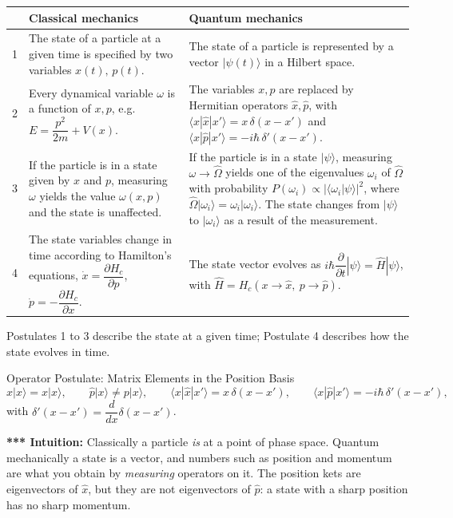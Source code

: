 \documentclass[11pt,a4paper]{article}
\begin{document}
\begin{center}
\renewcommand{\arraystretch}{1.25}
\begin{tabular}{@{}p{0.6cm}p{6.9cm}p{8.2cm}@{}}
\toprule
 & \textbf{Classical mechanics} & \textbf{Quantum mechanics}\\
\midrule
1 & The state of a particle at a given time is specified by two variables $x(t),\,p(t)$. & The state of a particle is represented by a vector $|\psi(t)\rangle$ in a Hilbert space.\\[3pt]
2 & Every dynamical variable $\omega$ is a function of $x,p$, e.g.\ $E=\dfrac{p^2}{2m}+V(x)$. & The variables $x,p$ are replaced by Hermitian operators $\hat x,\hat p$, with $\langle x|\hat x|x'\rangle=x\,\delta(x-x')$ and $\langle x|\hat p|x'\rangle=-i\hbar\,\delta'(x-x')$.\\[3pt]
3 & If the particle is in a state given by $x$ and $p$, measuring $\omega$ yields the value $\omega(x,p)$ and the state is unaffected. & If the particle is in a state $|\psi\rangle$, measuring $\omega\to\hat\Omega$ yields one of the eigenvalues $\omega_i$ of $\hat\Omega$ with probability $P(\omega_i)\propto|\langle\omega_i|\psi\rangle|^2$, where $\hat\Omega|\omega_i\rangle=\omega_i|\omega_i\rangle$. The state changes from $|\psi\rangle$ to $|\omega_i\rangle$ as a result of the measurement.\\[3pt]
4 & The state variables change in time according to Hamilton's equations, $\dot x=\dfrac{\partial H_c}{\partial p}$, $\dot p=-\dfrac{\partial H_c}{\partial x}$. & The state vector evolves as $i\hbar\dfrac{\partial}{\partial t}|\psi\rangle=\hat H|\psi\rangle$, with $\hat H=H_c(x\to\hat x,\ p\to\hat p)$.\\
\bottomrule
\end{tabular}
\end{center}

Postulates 1 to 3 describe the state at a given time; Postulate 4 describes how the state evolves in time.

\begin{thm}{Operator Postulate: Matrix Elements in the Position Basis}
\[
\hat x|x\rangle=x|x\rangle,\qquad \hat p|x\rangle\neq p|x\rangle,\qquad
\langle x|\hat x|x'\rangle=x\,\delta(x-x'),\qquad \langle x|\hat p|x'\rangle=-i\hbar\,\delta'(x-x'),
\]
with $\delta'(x-x')=\dfrac{d}{dx}\delta(x-x')$.
\end{thm}

\textbf{*** Intuition:} Classically a particle \emph{is} at a point of phase space. Quantum mechanically a state is a vector, and numbers such as position and momentum are what you obtain by \emph{measuring} operators on it. The position kets are eigenvectors of $\hat x$, but they are not eigenvectors of $\hat p$: a state with a sharp position has no sharp momentum.
\end{document}
